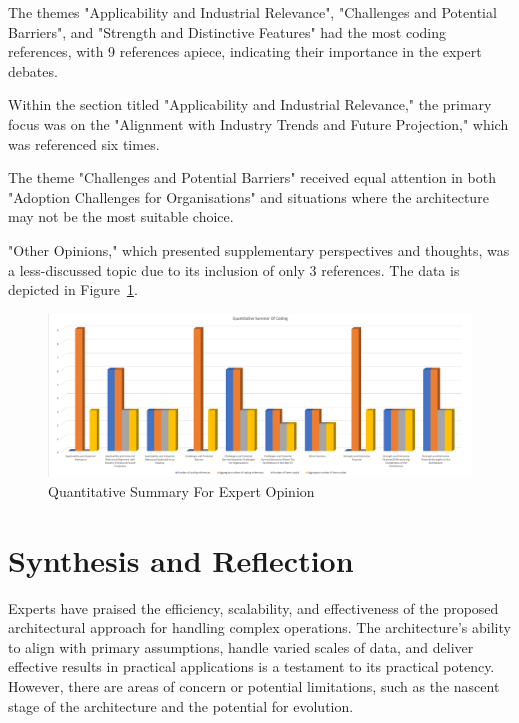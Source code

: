 \documentclass{ieeeaccess}
\begin{document}
The themes "Applicability and Industrial Relevance", "Challenges and Potential Barriers", and "Strength and Distinctive Features" had the most coding references, with 9 references apiece, indicating their importance in the expert debates.

Within the section titled "Applicability and Industrial Relevance," the primary focus was on the "Alignment with Industry Trends and Future Projection," which was referenced six times.

The theme "Challenges and Potential Barriers" received equal attention in both "Adoption Challenges for Organisations" and situations where the architecture may not be the most suitable choice.

"Other Opinions," which presented supplementary perspectives and thoughts, was a less-discussed topic due to its inclusion of only 3 references. The data is depicted in Figure~\ref{fig:quantitativeSummaryForExpertOpinion}.

\begin{figure}[h]

  \centering

  \includegraphics[width=\textwidth]{images/Quantitative-Summary-For-Codes.png}

  \caption{Quantitative Summary For Expert Opinion}

  \label{fig:quantitativeSummaryForExpertOpinion}

\end{figure}

\section{Synthesis and Reflection} \label{expertOpinion_synthesisReflection}

Experts have praised the efficiency, scalability, and effectiveness of the proposed architectural approach for handling complex operations. The architecture's ability to align with primary assumptions, handle varied scales of data, and deliver effective results in practical applications is a testament to its practical potency. However, there are areas of concern or potential limitations, such as the nascent stage of the architecture and the potential for evolution.
\end{document}
